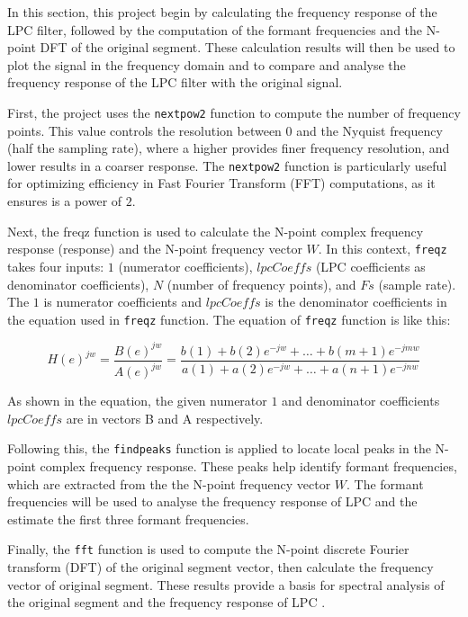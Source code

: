 \documentclass{article}
\begin{document}
In this section, this project begin by calculating the frequency response of the LPC filter, followed by the computation of the formant frequencies and the N-point DFT of the original segment. These calculation results will then be used to plot the signal in the frequency domain and to compare and analyse the frequency response of the LPC filter with the original signal.

First, the project uses the \verb+nextpow2+ function to compute the number of frequency points. This value controls the resolution between $0$ and the Nyquist frequency (half the sampling rate), where a higher provides finer frequency resolution, and lower results in a coarser response. The \verb+nextpow2+ function is particularly useful for optimizing efficiency in Fast Fourier Transform (FFT) computations, as it ensures is a power of $2$.

Next, the freqz function is used to calculate the N-point complex frequency response (response) and the N-point frequency vector $W$. In this context, \verb+freqz+ takes four inputs: $1$ (numerator coefficients), $lpcCoeffs$ (LPC coefficients as denominator coefficients), $N$ (number of frequency points), and $Fs$ (sample rate). The $1$ is numerator coefficients and $lpcCoeffs$ is the denominator coefficients in the equation used in \verb+freqz+ function. The equation of \verb+freqz+ function is like this\citep{MATLAB}:

\begin{equation}
\label{eqn:freqz}
H(e)^{jw} = \frac{B(e)^{jw}}{A(e)^{jw}} = \frac{b(1) + b(2)e^{-jw} + \dots + b(m+1)e^{-jmw}}{a(1) + a(2)e^{-jw} + \dots + a(n+1)e^{-jnw}}
\end{equation}

As shown in the equation, the given numerator $1$ and denominator coefficients $lpcCoeffs$ are in vectors B and A respectively.

Following this, the \verb+findpeaks+ function is applied to locate local peaks in the N-point complex frequency response. These peaks help identify formant frequencies, which are extracted from the the N-point frequency vector $W$.  The formant frequencies will be used to analyse the frequency response of LPC and the estimate the first three formant frequencies. 

Finally, the \verb+fft+ function is used to compute the N-point discrete Fourier transform (DFT) of the original segment vector, then calculate the frequency  vector of original segment. These results provide a basis for spectral analysis of the original segment and the frequency response of LPC .
\end{document}
